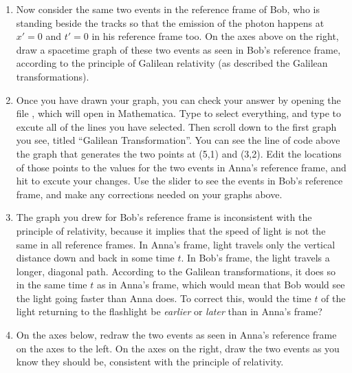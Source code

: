 \begin{enumerate}

\item 
Now consider the same two events in the reference frame of Bob, who is standing beside the tracks so that the emission of the photon  happens at $x'=0$ and $t'=0$ in his reference frame too.
On the axes above on the right, draw a spacetime graph of these two events as seen in Bob's reference frame, according to the principle of Galilean relativity (as described the Galilean transformations).

\item Once you have drawn your graph, you can check your answer by 
opening the file , which will open in Mathematica.  Type  to select everything, and type  to excute all of the lines you have selected.  Then scroll down to the first graph you see, titled ``Galilean Transformation''.  You can see the line of code above the graph that generates the two points at (5,1) and (3,2). Edit the locations of those points to the values for the two events in Anna's reference frame, and hit  to excute your changes.  Use the slider to see the events in Bob's reference frame, and make any corrections needed on your graphs above.

\item The graph you drew for Bob's reference frame is inconsistent with the principle of relativity, because it implies that the speed of light is not the same in all reference frames.  In Anna's frame, light travels only the vertical distance down and back in some time $t$.  In Bob's frame, the light travels a longer, diagonal path.  According to the Galilean transformations, it does so in the same time $t$ as in Anna's frame, which would mean that Bob would see the light going faster than Anna does.  To correct this, would the time $t$ of the light returning to the flashlight be \textit{earlier} or \textit{later} than in Anna's frame?
\answerspace{0.4in}

\pagebreak[2]
\item On the axes below, redraw the two events as seen in Anna's reference frame on the axes to the left.  On the axes on the right, draw the two events as you know they should be, consistent with the principle of relativity.


\end{enumerate}
